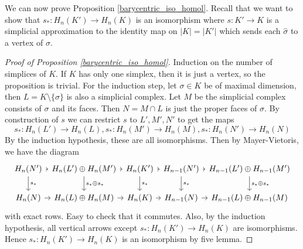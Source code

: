 We can now prove Proposition \ref{barycentric_iso_homol}.
Recall that we want to show that $s_\ast:H_n(K')\to H_n(K)$ is an isomorphism where $s:K'\to K$ is a simplicial approximation to the identity map on $|K|=|K'|$ which sends each $\hat\sigma$ to a vertex of $\sigma$.
\begin{proof}[Proof of Proposition \ref{barycentric_iso_homol}]
    Induction on the number of simplices of $K$.
    If $K$ has only one simplex, then it is just a vertex, so the proposition is trivial.
    For the induction step, let $\sigma\in K$ be of maximal dimension, then $L=K\setminus \{\sigma\}$ is also a simplicial complex.
    Let $M$ be the simplicial complex consists of $\sigma$ and its faces.
    Then $N=M\cap L$ is just the proper faces of $\sigma$.
    By construction of $s$ we can restrict $s$ to $L',M',N'$ to get the maps
    $$s_\ast:H_n(L')\to H_n(L),s_\ast:H_n(M')\to H_n(M),s_\ast:H_n(N')\to H_n(N)$$
    By the induction hypothesis, these are all isomorphisms.
    Then by Mayer-Vietoris, we have the diagram
    \[
        \begin{tikzcd}[column sep=0.34em]
            H_n(N')\arrow{r}\arrow{d}{s_\ast}&H_n(L')\oplus H_n(M')\arrow{r}\arrow{d}{s_\ast\oplus s_\ast}&H_n(K')\arrow{r}\arrow{d}{s_\ast}&H_{n-1}(N')\arrow{r}\arrow{d}{s_\ast}&H_{n-1}(L')\oplus H_{n-1}(M')\arrow{d}{s_\ast\oplus s_\ast}\\
            H_n(N)\arrow{r}&H_n(L)\oplus H_n(M)\arrow{r}&H_n(K)\arrow{r}&H_{n-1}(N)\arrow{r}&H_{n-1}(L)\oplus H_{n-1}(M)
        \end{tikzcd}
    \]
    with exact rows.
    Easy to check that it commutes.
    Also, by the induction hypothesis, all vertical arrows except $s_\ast:H_n(K')\to H_n(K)$ are isomorphisms.
    Hence $s_\ast:H_n(K')\to H_n(K)$ is an isomorphism by five lemma.
\end{proof}
